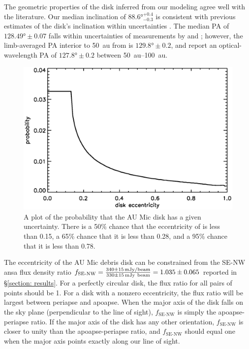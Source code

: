 \documentclass[modern]{aastex62}
\begin{document}
The geometric properties of the disk inferred from our modeling agree well with the literature. 
Our median inclination of $\ang[angle-symbol-over-decimal]{88.6}^{+0.4}_{-0.3}$ is consistent with previous estimates of the disk's inclination within uncertainties \citep{metchev05,krist05}.
The median PA of $\ang[angle-symbol-over-decimal]{128.49} \pm 0.07$ falls within uncertainties of measurements by \citet{macgregor13} and \citet{krist05}; however, the limb-averaged PA interior to \SI{50}{au} from \citet{metchev05} is $\ang[angle-symbol-over-decimal]{129.8} \pm 0.2$, and \citet{schneider14} report an optical-wavelength PA of $\ang[angle-symbol-over-decimal]{127.8} \pm 0.2$ between \SIrange{50}{100}{au}.

\begin{figure}
  \centering
  \includegraphics[width=\linewidth]{../figures/eccdiffprobplot.eps}
  \caption{
    A plot of the probability that the AU Mic disk has a given uncertainty.
    There is a 50\% chance that the eccentricity of is less than 0.15, a 65\% chance that it is less than 0.28, and a 95\% chance that it is less than 0.78.
  }
  \label{fig: eccentricity}
\end{figure}

The eccentricity of the AU Mic debris disk can be constrained from the SE-NW ansa flux density ratio $f_{\text{SE-NW}} = \frac{\SI{340 \pm 15}{mJy / beam}}{\SI{330 \pm 15}{mJy \ beam}} = \num{1.035 \pm 0.065}$ reported in \S \ref{section: results}.
For a perfectly circular disk, the flux ratio for all pairs of points should be 1. 
For a disk with a nonzero eccentricity, the flux ratio will be largest between periapse and apoapse. 
When the major axis of the disk falls on the sky plane (perpendicular to the line of sight), $f_{\text{SE-NW}}$ is simply the apoapse-periapse ratio. 
If the major axis of the disk has any other orientation, $f_{\text{SE-NW}}$ is closer to unity than the apoapse-periapse ratio, and $f_{\text{SE-NW}}$ should equal one when the major axis points exactly along our line of sight.
\end{document}
